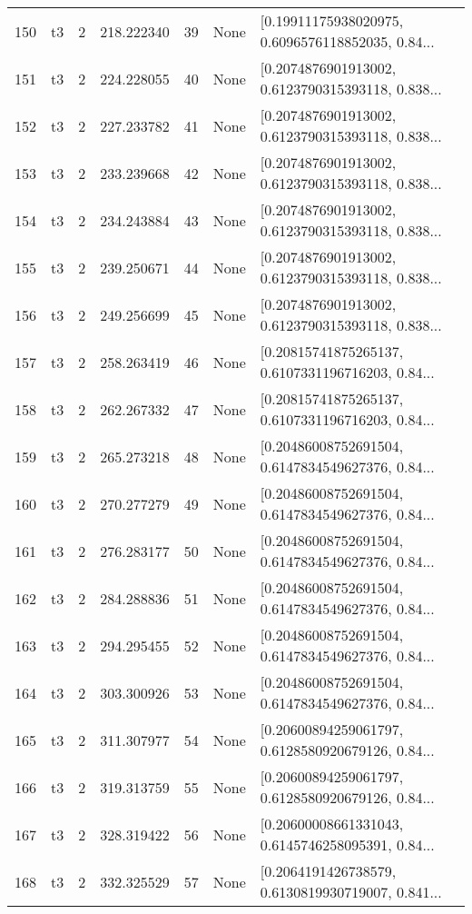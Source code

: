 \begin{tabular}{lllrlll}
150 &  t3 &   2 &  218.222340 &   39 &  None &  [0.19911175938020975, 0.6096576118852035, 0.84... \\
151 &  t3 &   2 &  224.228055 &   40 &  None &  [0.2074876901913002, 0.6123790315393118, 0.838... \\
152 &  t3 &   2 &  227.233782 &   41 &  None &  [0.2074876901913002, 0.6123790315393118, 0.838... \\
153 &  t3 &   2 &  233.239668 &   42 &  None &  [0.2074876901913002, 0.6123790315393118, 0.838... \\
154 &  t3 &   2 &  234.243884 &   43 &  None &  [0.2074876901913002, 0.6123790315393118, 0.838... \\
155 &  t3 &   2 &  239.250671 &   44 &  None &  [0.2074876901913002, 0.6123790315393118, 0.838... \\
156 &  t3 &   2 &  249.256699 &   45 &  None &  [0.2074876901913002, 0.6123790315393118, 0.838... \\
157 &  t3 &   2 &  258.263419 &   46 &  None &  [0.20815741875265137, 0.6107331196716203, 0.84... \\
158 &  t3 &   2 &  262.267332 &   47 &  None &  [0.20815741875265137, 0.6107331196716203, 0.84... \\
159 &  t3 &   2 &  265.273218 &   48 &  None &  [0.20486008752691504, 0.6147834549627376, 0.84... \\
160 &  t3 &   2 &  270.277279 &   49 &  None &  [0.20486008752691504, 0.6147834549627376, 0.84... \\
161 &  t3 &   2 &  276.283177 &   50 &  None &  [0.20486008752691504, 0.6147834549627376, 0.84... \\
162 &  t3 &   2 &  284.288836 &   51 &  None &  [0.20486008752691504, 0.6147834549627376, 0.84... \\
163 &  t3 &   2 &  294.295455 &   52 &  None &  [0.20486008752691504, 0.6147834549627376, 0.84... \\
164 &  t3 &   2 &  303.300926 &   53 &  None &  [0.20486008752691504, 0.6147834549627376, 0.84... \\
165 &  t3 &   2 &  311.307977 &   54 &  None &  [0.20600894259061797, 0.6128580920679126, 0.84... \\
166 &  t3 &   2 &  319.313759 &   55 &  None &  [0.20600894259061797, 0.6128580920679126, 0.84... \\
167 &  t3 &   2 &  328.319422 &   56 &  None &  [0.20600008661331043, 0.6145746258095391, 0.84... \\
168 &  t3 &   2 &  332.325529 &   57 &  None &  [0.2064191426738579, 0.6130819930719007, 0.841... \\

\end{tabular}

